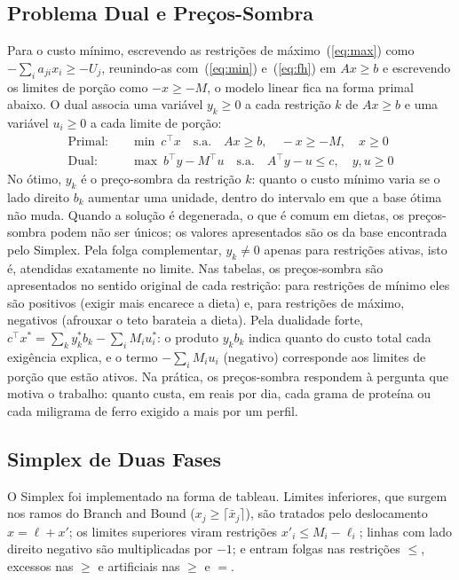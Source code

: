 \documentclass[12pt]{article}
\begin{document}
\subsection{Problema Dual e Preços-Sombra}

Para o custo mínimo, escrevendo as restrições de máximo~(\ref{eq:max}) como
$-\sum_i a_{ji} x_i \geq -U_j$, reunindo-as com~(\ref{eq:min}) e~(\ref{eq:fh}) em
$Ax \geq b$ e escrevendo os limites de porção como $-x \geq -M$, o modelo linear fica
na forma primal abaixo. O dual associa uma variável $y_k \geq 0$ a cada restrição $k$
de $Ax \geq b$ e uma variável $u_i \geq 0$ a cada limite de porção:
\begin{align}
\text{Primal:} \quad & \min \ c^\top x \quad \text{s.a.} \quad A x \geq b, \quad -x \geq -M, \quad x \geq 0 \label{eq:primal}\\
\text{Dual:} \quad & \max \ b^\top y - M^\top u \quad \text{s.a.} \quad A^\top y - u \leq c, \quad y, u \geq 0 \label{eq:dual}
\end{align}
No ótimo, $y_k$ é o preço-sombra da restrição $k$: quanto o custo mínimo varia se o
lado direito $b_k$ aumentar uma unidade, dentro do intervalo em que a base ótima não
muda. Quando a solução é degenerada, o que é comum em dietas, os preços-sombra podem não
ser únicos; os valores apresentados são os da base encontrada pelo Simplex. Pela folga
complementar, $y_k \neq 0$ apenas para restrições ativas, isto é, atendidas exatamente
no limite. Nas tabelas, os preços-sombra são apresentados no sentido original de cada
restrição: para restrições de mínimo eles são positivos (exigir mais encarece a dieta)
e, para restrições de máximo, negativos (afrouxar o teto barateia a dieta). Pela
dualidade forte, $c^\top x^* = \sum_k y_k^* b_k - \sum_i M_i u_i^*$: o produto $y_k b_k$
indica quanto do custo total cada exigência explica, e o termo $-\sum_i M_i u_i$
(negativo) corresponde aos limites de porção que estão ativos. Na prática, os preços-sombra respondem à pergunta que motiva o trabalho:
quanto custa, em reais por dia, cada grama de proteína ou cada miligrama de ferro
exigido a mais por um perfil.

\subsection{Simplex de Duas Fases}

O Simplex foi implementado na forma de tableau. Limites inferiores, que surgem nos
ramos do Branch and Bound ($x_j \geq \lceil \bar{x}_j \rceil$), são tratados pelo
deslocamento $x = \ell + x'$; os limites superiores viram restrições
$x'_i \leq M_i - \ell_i$; linhas com lado direito negativo são multiplicadas por $-1$;
e entram folgas nas restrições $\leq$, excessos nas $\geq$ e artificiais nas $\geq$ e
$=$.
\end{document}
